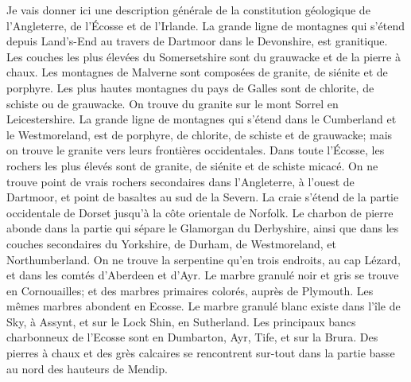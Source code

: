 Je vais donner ici une description générale de la constitution géologique de l'Angleterre, de l'Écosse et de l'Irlande. La grande ligne de montagnes qui s'étend depuis Land's-End au travers de Dartmoor dans le Devonshire, est granitique. Les couches les plus élevées du Somersetshire sont du grauwacke et de la pierre à chaux. Les montagnes de Malverne sont composées de granite, de siénite et de porphyre. Les plus hautes montagnes du pays de Galles sont de chlorite, de schiste ou de grauwacke. On trouve du granite sur le mont Sorrel en Leicestershire. La grande ligne de montagnes qui s'étend dans le Cumberland et le Westmoreland, est de porphyre, de chlorite, de schiste et de grauwacke; mais on trouve le granite vers leurs frontières occidentales. Dans toute l'Écosse, les rochers les plus élevés sont de granite, de siénite et de schiste micacé. On ne trouve point de vrais rochers secondaires dans l'Angleterre, à l'ouest de Dartmoor, et point de basaltes au sud de la Severn. La craie s'étend de la partie occidentale de Dorset jusqu'à la côte orientale de Norfolk. Le charbon de pierre\setcounter{page}{479} abonde dans la partie qui sépare le Glamorgan du Derbyshire, ainsi que dans les couches secondaires du Yorkshire, de Durham, de Westmoreland, et Northumberland. On ne trouve la serpentine qu’en trois endroits, au cap Lézard, et dans les comtés d’Aberdeen et d’Ayr. Le marbre granulé noir et gris se trouve en Cornouailles; et des marbres primaires colorés, auprès de Plymouth. Les mêmes marbres abondent en Ecosse. Le marbre granulé blanc existe dans l’île de Sky, à Assynt, et sur le Lock Shin, en Sutherland. Les principaux bancs charbonneux de l’Ecosse sont en Dumbarton, Ayr, Tife, et sur la Brura. Des pierres à chaux et des grès calcaires se rencontrent sur-tout dans la partie basse au nord des hauteurs de Mendip.
